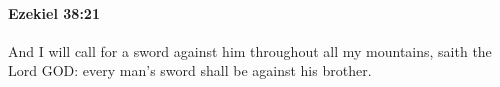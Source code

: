 
		\paragraph{Ezekiel 38:21} %
			\label{EZEKIEL-38-21}

			And I will call for a sword against him throughout all my mountains, saith the Lord GOD: every man’s sword shall be against his brother.



